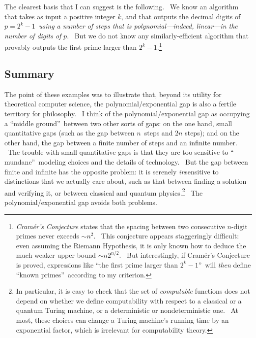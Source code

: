 \documentclass[11pt,onecolumn]{article}%
\begin{document}
The clearest basis that I can suggest is the following. \ We know an algorithm
that takes as input a positive integer $k$, and that outputs the decimal
digits of $p=2^{k}-1$\ \textit{using a number of steps that is
polynomial---indeed, linear---in the number of digits of }$p$. \ But we do not
know any similarly-efficient algorithm that provably outputs the first prime
larger than $2^{k}-1$.\footnote{\textit{Cram\'{e}r's Conjecture} states that
the spacing between two consecutive $n$-digit primes never exceeds $\sim
n^{2}$. \ This conjecture appears staggeringly difficult: even assuming the
Riemann Hypothesis, it is only known how to deduce the much weaker upper bound
$\sim n2^{n/2}$. \ But interestingly, if Cram\'{e}r's Conjecture is proved,
expressions like \textquotedblleft the first prime larger than $2^{k}%
-1$\textquotedblright\ will \textit{then} define \textquotedblleft known
primes\textquotedblright\ according to my criterion.}

\subsection{Summary}

The point of these examples was to illustrate that, beyond its utility for
theoretical computer science, the polynomial/exponential gap is also a fertile
territory for philosophy. \ I think of the polynomial/exponential gap as
occupying a \textquotedblleft middle ground\textquotedblright\ between two
other sorts of gaps: on the one hand, small quantitative gaps (such as the gap
between $n$\ steps and $2n$ steps); and on the other hand, the gap between a
finite number of steps and an infinite number. \ The trouble with small
quantitative gaps is that they are too sensitive to \textquotedblleft
mundane\textquotedblright\ modeling choices and the details of technology.
\ But the gap between finite and infinite has the opposite problem: it is
serenely \textit{in}sensitive to distinctions that we actually care about,
such as that between finding a solution and verifying it, or between classical
and quantum physics.\footnote{In particular, it is easy to check that the set
of \textit{computable} functions does not depend on whether we define
computability with respect to a classical or a quantum Turing machine, or a
deterministic or nondeterministic one. \ At most, these choices can change a
Turing machine's running time by an exponential factor, which is irrelevant
for computability theory.} \ The polynomial/exponential gap avoids both problems.
\end{document}
